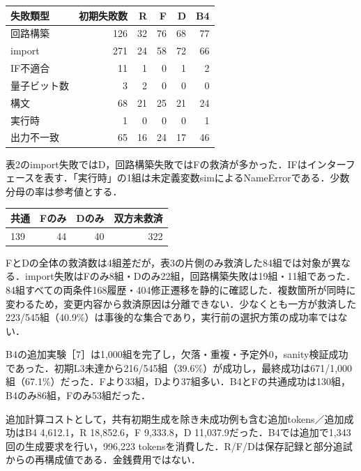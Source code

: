 \documentclass[a4paper,10pt,twocolumn]{extarticle}
\begin{document}
\begin{center}\begin{minipage}{\linewidth}\centering
{}
\begin{tabular}{@{}lrrrrr@{}}\hline
失敗類型 & 初期失敗数 & R & F & D & B4\\\hline
回路構築 & 126 & 32 & 76 & 68 & 77\\
import & 271 & 24 & 58 & 72 & 66\\
IF不適合 & 11 & 1 & 0 & 1 & 2\\
量子ビット数 & 3 & 2 & 0 & 0 & 0\\
構文 & 68 & 21 & 25 & 21 & 24\\
実行時 & 1 & 0 & 0 & 0 & 1\\
出力不一致 & 65 & 16 & 24 & 17 & 46\\
\hline\end{tabular}\end{minipage}\end{center}
表2のimport失敗ではD，回路構築失敗ではFの救済が多かった．IFはインターフェースを表す．「実行時」の1組は未定義変数simによるNameErrorである．少数分母の率は参考値とする．

\begin{center}\begin{minipage}{\linewidth}\centering
{}
\begin{tabular}{@{}lrrr@{}}\hline
共通 & Fのみ & Dのみ & 双方未救済\\\hline
139 & 44 & 40 & 322\\
\hline\end{tabular}\end{minipage}\end{center}
FとDの全体の救済数は4組差だが，表3の片側のみ救済した84組では対象が異なる．import失敗はFのみ8組・Dのみ22組，回路構築失敗は19組・11組であった．84組すべての両条件168履歴・404修正遷移を静的に確認した．複数箇所が同時に変わるため，変更内容から救済原因は分離できない．少なくとも一方が救済した223/545組（40.9\%）は事後的な集合であり，実行前の選択方策の成功率ではない．

B4の追加実験［7］は1,000組を完了し，欠落・重複・予定外0，sanity検証成功であった．初期L3未達から216/545組（39.6\%）が成功し，最終成功は671/1,000組（67.1\%）だった．Fより33組，Dより37組多い．B4とFの共通成功は130組，B4のみ86組，Fのみ53組だった．

追加計算コストとして，共有初期生成を除き未成功例も含む追加tokens／追加成功はB4 4,612.1，R 18,852.6，F 9,333.8，D 11,037.9だった．B4では追加で1,343回の生成要求を行い，996,223 tokensを消費した．R/F/Dは保存記録と部分追試からの再構成値である．金銭費用ではない．
\end{document}

